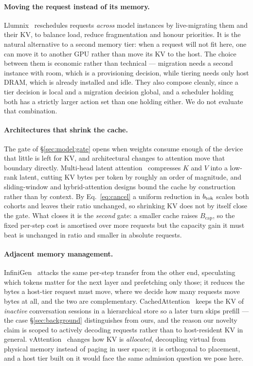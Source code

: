 \paragraph{Moving the request instead of its memory.} Llumnix~\cite{llumnix}
reschedules requests \emph{across} model instances by live-migrating them and their
KV, to balance load, reduce fragmentation and honour priorities. It is the natural
alternative to a second memory tier: when a request will not fit here, one can move
it to another GPU rather than move its KV to the host. The choice between them is
economic rather than technical --- migration needs a second instance with room,
which is a provisioning decision, while tiering needs only host DRAM, which is
already installed and idle. They also compose cleanly, since a tier decision is
local and a migration decision global, and a scheduler holding both has a strictly
larger action set than one holding either. We do not evaluate that combination.

\paragraph{Architectures that shrink the cache.} The gate of
\S\ref{sec:model:gate} opens when weights consume enough of the device that little
is left for KV, and architectural changes to attention move that boundary directly.
Multi-head latent attention~\cite{deepseekv2} compresses $K$ and $V$ into a
low-rank latent, cutting KV bytes per token by roughly an order of magnitude, and
sliding-window and hybrid-attention designs bound the cache by construction rather
than by context. By Eq.~\ref{eq:cancel} a uniform reduction in $b_{\mathrm{tok}}$ scales both
cohorts and leaves their ratio unchanged, so shrinking KV does not by itself close
the gate. What closes it is the \emph{second} gate: a smaller cache raises
$B_{\mathrm{cap}}$, so the fixed per-step cost is amortised over more requests but
the capacity gain it must beat is unchanged in ratio and smaller in absolute
requests.

\paragraph{Adjacent memory management.}
InfiniGen~\cite{infinigen} attacks the same per-step transfer from the other
end, speculating which tokens matter for the next layer and prefetching only
those; it reduces the bytes a host-tier request must move, where we decide how
many requests move bytes at all, and the two are complementary.
CachedAttention~\cite{cachedattention} keeps the KV of \emph{inactive}
conversation sessions in a hierarchical store so a later turn skips prefill ---
the case \S\ref{sec:background} distinguishes from ours, and the reason our
novelty claim is scoped to actively decoding requests rather than to
host-resident KV in general. vAttention~\cite{vattention} changes how KV is
\emph{allocated}, decoupling virtual from physical memory instead of paging in
user space; it is orthogonal to placement, and a host tier built on it would
face the same admission question we pose here.



